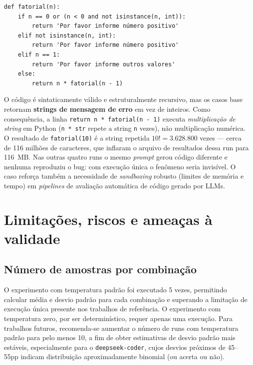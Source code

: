 \documentclass[12pt,
    english,
    french,
    spanish,
    brazil,
    ]{article}
\begin{document}
\begin{lstlisting}[style=python, caption={deepseek-coder em P3\_reformulado (run 4) — multiplicação de string exponencial}]
def fatorial(n):
    if n == 0 or (n < 0 and not isinstance(n, int)):
        return 'Por favor informe número positivo'
    elif not isinstance(n, int):
        return 'Por favor informe número positivo'
    elif n == 1:
        return 'Por favor informe outros valores'
    else:
        return n * fatorial(n - 1)
\end{lstlisting}

O código é sintaticamente válido e estruturalmente recursivo, mas os casos base retornam \textbf{strings de mensagem de erro} em vez de inteiros. Como consequência, a linha \texttt{return n * fatorial(n - 1)} executa \textit{multiplicação de string} em Python (\texttt{n * str} repete a string \texttt{n} vezes), não multiplicação numérica. O resultado de \texttt{fatorial(10)} é a string repetida $10! = 3.628.800$ vezes — cerca de 116 milhões de caracteres, que inflaram o arquivo de resultados dessa run para 116~MB. Nas outras quatro runs o mesmo \textit{prompt} gerou código diferente e nenhuma reproduziu o bug: com execução única o fenômeno seria invisível. O caso reforça também a necessidade de \textit{sandboxing} robusto (limites de memória e tempo) em \textit{pipelines} de avaliação automática de código gerado por LLMs.


\section{Limitações, riscos e ameaças à validade}

\subsection{Número de amostras por combinação}

O experimento com temperatura padrão foi executado 5 vezes, permitindo calcular média e desvio padrão para cada combinação e superando a limitação de execução única presente nos trabalhos de referência. O experimento com temperatura zero, por ser determinístico, requer apenas uma execução. Para trabalhos futuros, recomenda-se aumentar o número de runs com temperatura padrão para pelo menos 10, a fim de obter estimativas de desvio padrão mais estáveis, especialmente para o \texttt{deepseek-coder}, cujos desvios próximos de 45–55pp indicam distribuição aproximadamente binomial (ou acerta ou não).
\end{document}
